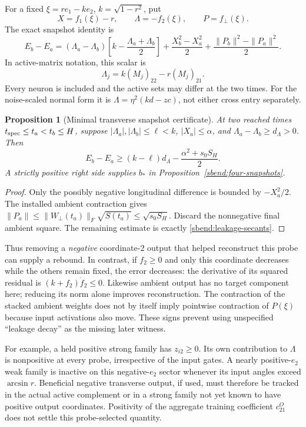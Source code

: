 \documentclass{article} %
\theoremstyle{plain}
\newtheorem{proposition}[theorem]{Proposition}
\theoremstyle{definition}
\theoremstyle{remark}
\begin{document}
For a fixed $\xi=re_1-ke_2$, $k=\sqrt{1-r^2}$, put
\[
 X=f_1(\xi)-r,\qquad \Lambda=-f_2(\xi),\qquad P=f_\perp(\xi).
\]
The exact snapshot identity is
\begin{equation}\label{sbend:leakage-secants}
 E_b-E_a=(\Lambda_a-\Lambda_b)
          \left[k-\frac{\Lambda_a+\Lambda_b}{2}\right]
       +\frac{X_b^2-X_a^2}{2}
       +\frac{\|P_b\|^2-\|P_a\|^2}{2}.
\end{equation}
In active-matrix notation, this scalar is
\[
 \Lambda_j=k(M_j)_{22}-r(M_j)_{21}.
\]
Every neuron is included and the active sets may differ at the two times.
For the noise-scaled normal form it is
$\Lambda=\eta^2(kd-zc)$, not either cross entry separately.

\begin{proposition}[Minimal transverse snapshot certificate]
\label{sbend:leakage-certificate}
At two reached times $t_{\rm spec}\le t_a<t_b\le H$, suppose
$|\Lambda_a|,|\Lambda_b|\le\ell<k$, $|X_a|\le\alpha$, and
$\Lambda_a-\Lambda_b\ge d_\Lambda>0$. Then
\begin{equation}\label{sbend:leakage-budget}
 E_b-E_a\ge (k-\ell)d_\Lambda
                          -\frac{\alpha^2+s_0S_H}{2}.
\end{equation}
A strictly positive right side supplies $b_*$ in
Proposition~\ref{sbend:four-snapshots}.
\end{proposition}
\begin{proof}
Only the possibly negative longitudinal difference is bounded by
$-X_a^2/2$. The installed ambient contraction gives
$\|P_a\|\le\|W_\perp(t_a)\|_F\sqrt{S(t_a)}
\le\sqrt{s_0S_H}$. Discard the nonnegative final ambient square.
The remaining estimate is exactly \eqref{sbend:leakage-secants}.
\end{proof}

Thus removing a \emph{negative} coordinate-2 output that helped reconstruct
this probe can supply a rebound. In contrast, if $f_2\ge0$ and only this
coordinate decreases while the others remain fixed, the error decreases:
the derivative of its squared residual is $(k+f_2)\dot f_2\le0$.
Likewise ambient output has no target component here; reducing its norm
alone improves reconstruction. The contraction of the stacked ambient
weights does not by itself imply pointwise contraction of $P(\xi)$ because
input activations also move. These signs prevent using unspecified
``leakage decay'' as the missing later witness.

For example, a held positive strong family has $z_{i2}\ge0$. Its own
contribution to $\Lambda$ is nonpositive at every probe, irrespective of
the input gates. A nearly positive-$e_2$ weak family is inactive on this
negative-$e_2$ sector whenever its input angles exceed $\arcsin r$.
Beneficial negative transverse output, if used, must therefore be tracked
in the actual active complement or in a strong family not yet known to
have positive output coordinates. Positivity of the aggregate training
coefficient $c_{21}^O$ does not settle this probe-selected quantity.
\end{document}
